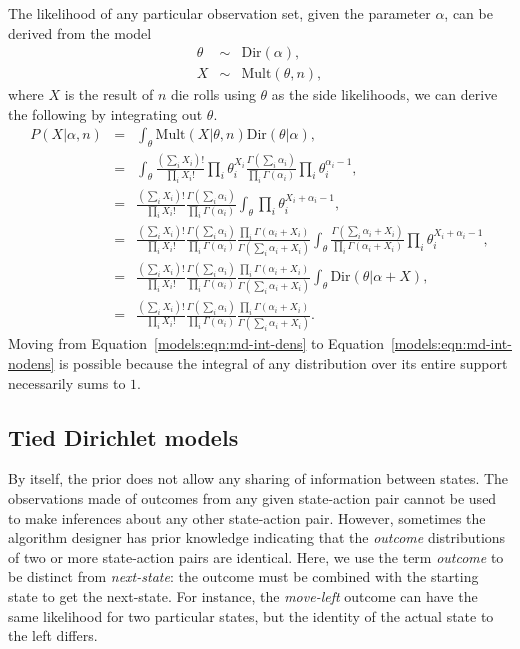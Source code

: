 The likelihood of any particular observation set, given the parameter $\alpha$, can be derived from the model
\begin{eqnarray}
\theta &\sim& \mbox{Dir}(\alpha),\\
X &\sim& \mbox{Mult}(\theta, n),
\end{eqnarray}
where $X$ is the result of $n$ die rolls using $\theta$ as the side likelihoods, we can derive the following by integrating out $\theta$.
\begin{eqnarray}
P(X|\alpha, n) &=& \int_\theta \mbox{Mult}(X|\theta,n) \mbox{Dir}(\theta|\alpha),\\
&=& \int_\theta \frac{\left(\sum_i X_i\right)!}{\prod_i X_i!} \prod_i\theta_i^{X_i} \frac{\Gamma\left(\sum_i \alpha_i\right)}{\prod_i \Gamma(\alpha_i)} \prod_i\theta_i^{\alpha_i-1},\\
&=& \frac{\left(\sum_i X_i\right)!}{\prod_i X_i!} \frac{\Gamma\left(\sum_i \alpha_i\right)} {\prod_i \Gamma(\alpha_i)}\int_\theta \prod_i\theta_i^{X_i+\alpha_i-1},\\
&=& \frac{\left(\sum_i X_i\right)!}{\prod_i X_i!} \frac{\Gamma\left(\sum_i \alpha_i\right)} {\prod_i \Gamma(\alpha_i)} \frac {\prod_i \Gamma(\alpha_i+X_i)} {\Gamma\left(\sum_i \alpha_i+X_i\right)} \int_\theta \frac{\Gamma\left(\sum_i \alpha_i+X_i\right)} {\prod_i \Gamma(\alpha_i+X_i)}  \prod_i\theta_i^{X_i+\alpha_i-1},\\
\label{models:eqn:md-int-dens}&=& \frac{\left(\sum_i X_i\right)!}{\prod_i X_i!} \frac{\Gamma\left(\sum_i \alpha_i\right)} {\prod_i \Gamma(\alpha_i)} \frac {\prod_i \Gamma(\alpha_i+X_i)} {\Gamma\left(\sum_i \alpha_i+X_i\right)} \int_\theta \mbox{Dir}(\theta|\alpha+X),\\
\label{models:eqn:md-int-nodens}&=& \frac{\left(\sum_i X_i\right)!}{\prod_i X_i!} \frac{\Gamma\left(\sum_i \alpha_i\right)} {\prod_i \Gamma(\alpha_i)} \frac {\prod_i \Gamma(\alpha_i+X_i)} {\Gamma\left(\sum_i \alpha_i+X_i\right)}.
\end{eqnarray}
Moving from Equation~\ref{models:eqn:md-int-dens} to Equation~\ref{models:eqn:md-int-nodens} is possible because the integral of any distribution over its entire support necessarily sums to $1$.



\subsection{Tied Dirichlet models}

By itself, the  prior does not allow any sharing of information between states. The observations made of outcomes from any given state-action pair cannot be used to make inferences about any other state-action pair. However, sometimes the algorithm designer has prior knowledge indicating that the \emph{outcome} distributions of two or more state-action pairs are identical. Here, we use the term \emph{outcome} to be distinct from \emph{next-state}: the outcome must be combined with the starting state to get the next-state. For instance, the \emph{move-left} outcome can have the same likelihood for two particular states, but the identity of the actual state to the left differs.

